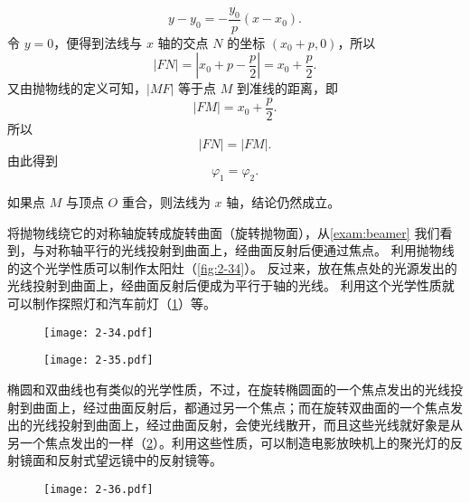 \medskip
\[ y-y_0=-\frac{y_0}{p}(x-x_0).\]
令 $y=0$，便得到法线与 $x$ 轴的交点 $N$ 的坐标 $(x_0+p,0)$，所以
\[|FN|=\left|x_0+p-\frac{p}{2}\right|=x_0+\frac{p}{2}.\]
又由抛物线的定义可知，$|MF|$ 等于点 $M$ 到准线的距离，即
\[|FM|=x_0+\frac{p}{2}.\]
所以
\[|FN|=|FM|.\]
由此得到
\[\varphi_1=\varphi_2.\]

如果点 $M$ 与顶点 $O$ 重合，则法线为 $x$ 轴，结论仍然成立。

将抛物线绕它的对称轴旋转成旋转曲面（旋转抛物面），从\cref{exam:beamer} 我们看到，与对称轴平行的光线投射到曲面上，经曲面反射后便通过焦点。
利用抛物线的这个光学性质可以制作太阳灶（\cref{fig:2-34}）。
反过来，放在焦点处的光源发出的光线投射到曲面上，经曲面反射后便成为平行于轴的光线。
利用这个光学性质就可以制作探照灯和汽车前灯（\cref{fig:2-35}）等。
\begin{figure}
  \begin{minipage}[b]{0.48\linewidth}\centering
    \texttt{[image: 2-34.pdf]}
    \caption{}\label{fig:2-34}
  \end{minipage}
  \begin{minipage}[b]{0.48\linewidth}\centering
    \texttt{[image: 2-35.pdf]}
    \caption{}\label{fig:2-35}
  \end{minipage}
\end{figure}

椭圆和双曲线也有类似的光学性质，不过，在旋转椭圆面的一个焦点发出的光线投射到曲面上，经过曲面反射后，都通过另一个焦点；而在旋转双曲面的一个焦点发出的光线投射到曲面上，经过曲面反射，会使光线散开，而且这些光线就好象是从另一个焦点发出的一样（\cref{fig:2-36}）。利用这些性质，可以制造电影放映机上的聚光灯的反射镜面和反射式望远镜中的反射镜等。
\begin{figure}
    \texttt{[image: 2-36.pdf]}
    \caption{}\label{fig:2-36}
\end{figure}

